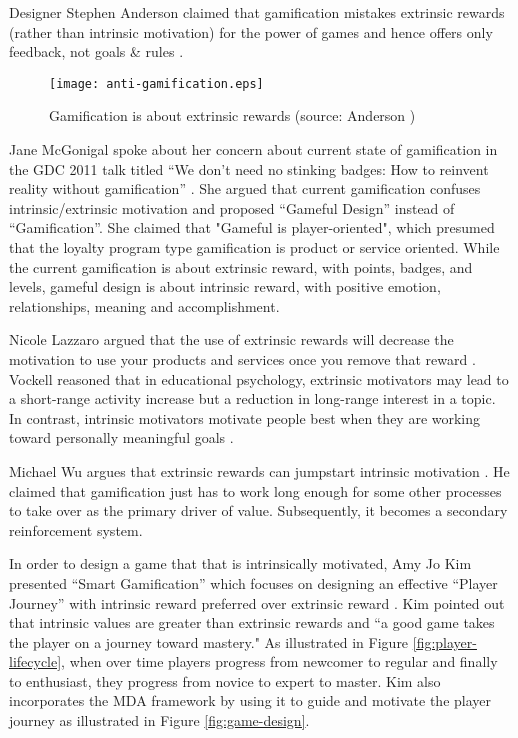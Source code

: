 Designer Stephen Anderson claimed that gamification mistakes extrinsic rewards (rather than intrinsic motivation) for the power of games and hence offers only feedback, not goals \& rules \cite {anderson2011}. 

\begin{figure}[ht!]
	\centering
		\texttt{[image: anti-gamification.eps]}
		\caption{Gamification is about extrinsic rewards (source: Anderson \cite {anderson2011})}
		\label{fig:anti-gamification}
\end{figure}

Jane McGonigal spoke about her concern about current state of gamification in the GDC 2011 talk titled ``We don't need no stinking badges: How to reinvent reality without gamification'' \cite {mcgonigal2011}. She argued that current gamification confuses intrinsic/extrinsic motivation and proposed ``Gameful Design'' instead of ``Gamification''. She claimed that "Gameful is player-oriented", which presumed that the loyalty program type gamification is product or service oriented. While the current gamification is about extrinsic reward, with points, badges, and levels, gameful design is about intrinsic reward, with positive emotion, relationships, meaning and accomplishment.

Nicole Lazzaro argued that the use of extrinsic rewards will decrease the motivation to use your products and services once you remove that reward \cite {Lazzaro2011}. Vockell reasoned that in educational psychology, extrinsic motivators may lead to a short-range activity increase but a reduction in long-range interest in a topic. In contrast, intrinsic motivators motivate people best when they are working toward personally meaningful goals \cite{vockell2004educational}. 

Michael Wu argues that extrinsic rewards can jumpstart intrinsic motivation  \cite {WuSustainable2011}. He claimed that gamification just has to work long enough for some other processes to take over as the primary driver of value. Subsequently, it becomes a secondary reinforcement system. 

In order to design a game that that is intrinsically motivated, Amy Jo Kim presented ``Smart Gamification'' which focuses on designing an effective ``Player Journey'' with intrinsic reward preferred over extrinsic reward \cite {Kim2010}. Kim pointed out that intrinsic values are greater than extrinsic rewards and ``a good game takes the player on a journey toward mastery." As illustrated in Figure \autoref{fig:player-lifecycle}, when over time players progress from newcomer to regular and finally to enthusiast, they progress from novice to expert to master. Kim also incorporates the MDA framework \cite {hunicke2004mda} by using it to guide and motivate the player journey as illustrated in Figure \autoref{fig:game-design}.

